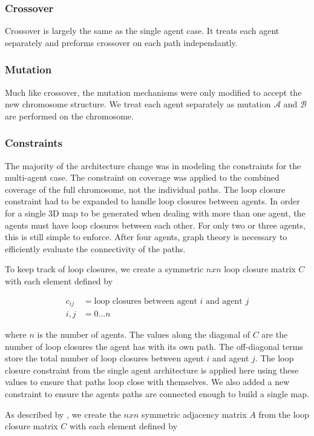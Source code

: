 \documentclass[letterpaper, 10 pt, conference]{ieeeconf}  %
\begin{document}
\subsubsection{Crossover}
Crossover is largely the same as the single agent case. It treats each agent separately and preforms crossover on each path independantly.

\subsubsection{Mutation}
Much like crossover, the mutation mechanisms were only modified to accept the new chromosome structure. We treat each agent separately as mutation $\mathcal{A}$ and $\mathcal{B}$ are performed on the chromosome.

\subsubsection{Constraints}
The majority of the architecture change was in modeling the constraints for the multi-agent case. The constraint on coverage was applied to the combined coverage of the full chromosome, not the individual paths. The loop closure constraint had to be expanded to handle loop closures between agents. In order for a single 3D map to be generated when dealing with more than one agent, the agents must have loop closures between each other. For only two or three agents, this is still simple to enforce. After four agents, graph theory is necessary to efficiently evaluate the connectivity of the paths.

To keep track of loop closures, we create a symmetric $nxn$ loop closure matrix $C$ with each element defined by

\begin{align}
  c_{ij} &= \text{loop closures between agent } i \text{ and agent } j \\
  i,j &= 0...n \nonumber
\end{align}

where $n$ is the number of agents. The values along the diagonal of $C$ are the number of loop closures the agent has with its own path. The off-diagonal terms store the total number of loop closures between agent $i$ and agent $j$. The loop closure constraint from the single agent architecture is applied here using these values to ensure that paths loop close with themselves. We also added a new constraint to ensure the agents paths are connected enough to build a single map.

As described by \cite{Weisstein}, we create the $nxn$ symmetric adjacency matrix $A$ from the loop closure matrix $C$ with each element defined by
\end{document}

